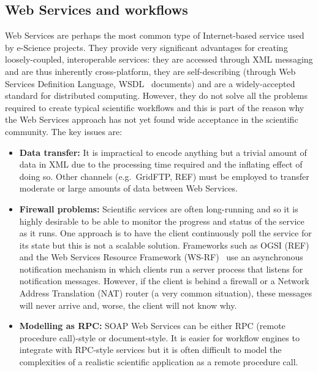 \documentclass{llncs}
\begin{document}
\subsection{Web Services and workflows}\label{sec:webservices}
Web Services are perhaps the most common type of Internet-based service used by e-Science projects.  They provide very significant advantages for creating loosely-coupled, interoperable services: they are accessed through XML messaging and are thus inherently cross-platform, they are self-describing (through Web Services Definition Language, WSDL~\cite{WSDL} documents) and are a widely-accepted standard for distributed computing.  However, they do not solve all the problems required to create typical scientific workflows and this is part of the reason why the Web Services approach has not yet found wide acceptance in the scientific community.  The key issues are:

\begin{itemize}
	\item {\bf Data transfer:} It is impractical to encode anything but a trivial amount of data in XML due to the processing time required and the inflating effect of doing so.  Other channels (e.g.\ GridFTP, REF) must be employed to transfer moderate or large amounts of data between Web Services.
	\item {\bf Firewall problems:} Scientific services are often long-running and so it is highly desirable to be able to monitor the progress and status of the service as it runs.  One approach is to have the client continuously poll the service for its state but this is not a scalable solution.  Frameworks such as OGSI (REF) and the Web Services Resource Framework (WS-RF)~\cite{wsrf} use an asynchronous notification mechanism in which clients run a server process that listens for notification messages.  However, if the client is behind a firewall or a Network Address Translation (NAT) router (a very common situation), these messages will never arrive and, worse, the client will not know why.
	\item {\bf Modelling as RPC:} SOAP Web Services can be either RPC (remote procedure call)-style or document-style.  It is easier for workflow engines to integrate with RPC-style services but it is often difficult to model the complexities of a realistic scientific application as a remote procedure call.
\end{itemize}
\end{document}
